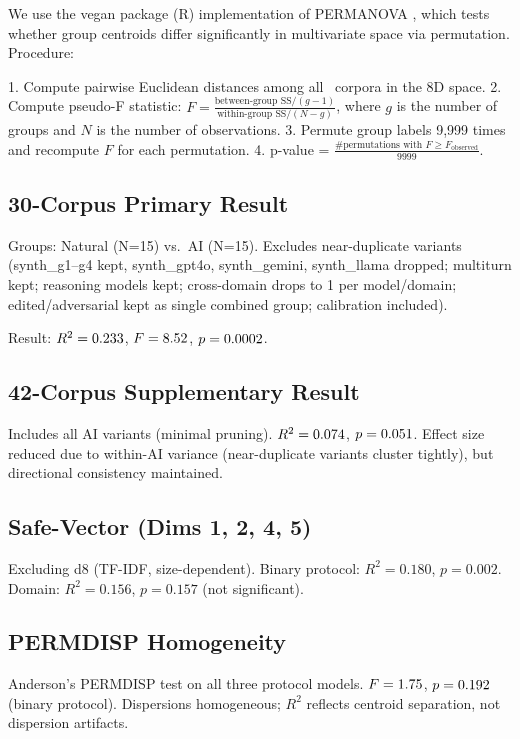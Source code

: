 \documentclass[final]{clv2025}
\begin{document}
We use the vegan package (R) implementation of PERMANOVA \citep{anderson2001permanova}, which tests whether group centroids differ significantly in multivariate space via permutation. Procedure:

1. Compute pairwise Euclidean distances among all \nCorpora\ corpora in the 8D space.
2. Compute pseudo-F statistic: $F = \frac{\text{between-group SS} / (g-1)}{\text{within-group SS} / (N - g)}$, where $g$ is the number of groups and $N$ is the number of observations.
3. Permute group labels 9,999 times and recompute $F$ for each permutation.
4. p-value = $\frac{\text{\# permutations with } F \geq F_{\text{observed}}}{9999}$.

\subsection{30-Corpus Primary Result}

Groups: Natural (N=15) vs.\ AI (N=15). Excludes near-duplicate variants (synth\_g1--g4 kept, synth\_gpt4o, synth\_gemini, synth\_llama dropped; multiturn kept; reasoning models kept; cross-domain drops to 1 per model/domain; edited/adversarial kept as single combined group; calibration included).

Result: $R^2 = 0.233$, $F = 8.52$, $p = 0.0002$.

\subsection{42-Corpus Supplementary Result}

Includes all AI variants (minimal pruning). $R^2 = 0.074$, $p = 0.051$. Effect size reduced due to within-AI variance (near-duplicate variants cluster tightly), but directional consistency maintained.

\subsection{Safe-Vector (Dims 1, 2, 4, 5)}

Excluding d8 (TF-IDF, size-dependent). Binary protocol: $R^2 = 0.180$, $p = 0.002$. Domain: $R^2 = 0.156$, $p = 0.157$ (not significant).

\subsection{PERMDISP Homogeneity}

Anderson's PERMDISP test on all three protocol models. $F = 1.75$, $p = 0.192$ (binary protocol). Dispersions homogeneous; $R^2$ reflects centroid separation, not dispersion artifacts.
\end{document}
